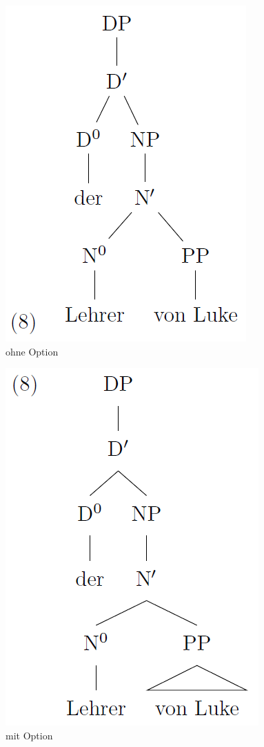 \begin{frame}[fragile]

\begin{minipage}[b]{.48\textwidth}
\begin{figure}
	\centering
	\includegraphics[width=.6\linewidth]{../../texfiles-beamer/tex-material/WissArb-latex/forest2}	
	\caption{ohne Option}
\end{figure}
\end{minipage}
\begin{minipage}[b]{.48\textwidth}
	\begin{figure}
		\centering
		\includegraphics[width=.63\linewidth]{../../texfiles-beamer/tex-material/WissArb-latex/forest1}
		\caption{mit Option}	
	\end{figure}
\end{minipage}


\end{frame}


